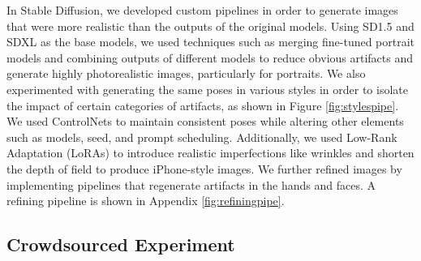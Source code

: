 In Stable Diffusion, we developed custom pipelines in order to generate images that were more realistic than the outputs of the original models. Using SD1.5 \cite{rombach2021highresolution} and SDXL \cite{podell2024sdxl} as the base models, we used techniques such as merging fine-tuned portrait models and combining outputs of different models to reduce obvious artifacts and generate highly photorealistic images, particularly for portraits.  We also experimented with generating the same poses in various styles in order to isolate the impact of certain categories of artifacts, as shown in Figure \ref{fig:stylespipe}. We used ControlNets \cite{zhang2023adding} to maintain consistent poses while altering other elements such as models, seed, and prompt scheduling. Additionally, we used Low-Rank Adaptation (LoRAs) \cite{hu2021loralowrankadaptationlarge} to introduce realistic imperfections like wrinkles and shorten the depth of field to produce iPhone-style images. We further refined images by implementing pipelines that regenerate artifacts in the hands and faces. A refining pipeline is shown in Appendix \ref{fig:refiningpipe}. 
\begin{figure*}[htb]
\centering
\captionsetup{justification=raggedright, singlelinecheck=false, skip=2pt}
\begin{subfigure}[t]{0.45\textwidth}
    \subcaption{}
\end{subfigure}
\begin{subfigure}[t]{0.5\textwidth}
    \subcaption{}
\end{subfigure}
\caption{ }
\label{fig:stylespipe}
\end{figure*}

\subsection{Crowdsourced Experiment} \label{sec:onlexp}

